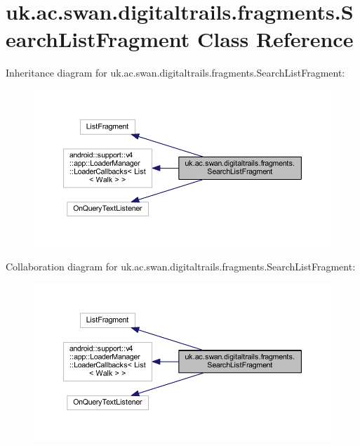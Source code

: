\hypertarget{classuk_1_1ac_1_1swan_1_1digitaltrails_1_1fragments_1_1_search_list_fragment}{\section{uk.\+ac.\+swan.\+digitaltrails.\+fragments.\+Search\+List\+Fragment Class Reference}
\label{classuk_1_1ac_1_1swan_1_1digitaltrails_1_1fragments_1_1_search_list_fragment}
}


Inheritance diagram for uk.\+ac.\+swan.\+digitaltrails.\+fragments.\+Search\+List\+Fragment\+:\nopagebreak
\begin{figure}[H]
\begin{center}
\leavevmode
\includegraphics[width=350pt]{classuk_1_1ac_1_1swan_1_1digitaltrails_1_1fragments_1_1_search_list_fragment__inherit__graph}
\end{center}
\end{figure}


Collaboration diagram for uk.\+ac.\+swan.\+digitaltrails.\+fragments.\+Search\+List\+Fragment\+:\nopagebreak
\begin{figure}[H]
\begin{center}
\leavevmode
\includegraphics[width=350pt]{classuk_1_1ac_1_1swan_1_1digitaltrails_1_1fragments_1_1_search_list_fragment__coll__graph}
\end{center}
\end{figure}
